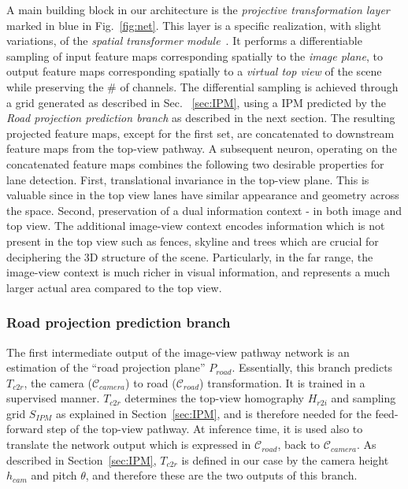 \documentclass[10pt,twocolumn,letterpaper]{article}
\begin{document}
A main building block in our architecture is the \emph{projective transformation layer} marked in blue in Fig.~\ref{fig:net}. This layer is a specific realization, with slight variations, of the \textit{spatial transformer  module}~\cite{spatial_transform}. It performs a differentiable sampling of input feature maps corresponding spatially to the \textit{image plane}, to output feature maps corresponding spatially to a \textit{virtual top view} of the scene while preserving the \# of channels. The differential sampling is achieved through a grid generated as described in Sec. ~\ref{sec:IPM}, using a IPM predicted by the \textit{Road projection prediction branch} as described in the next section. The resulting projected feature maps, except for the first set, are concatenated to downstream feature maps from the top-view pathway. A subsequent neuron, operating on the concatenated feature maps combines the following two desirable properties for lane detection. First, translational invariance in the top-view plane. This is valuable since in the top view lanes have similar appearance and geometry across the space. Second, preservation of a dual information context - in both image and top view. The additional image-view context encodes information which is not present in the top view such as fences, skyline and trees which are crucial for deciphering the 3D structure of the scene. Particularly, in the far range, the image-view context is much richer in visual information, and represents a much larger actual area compared to the top view.


\subsubsection{Road projection prediction branch}
\label{horizon_estimation}
The first intermediate output of the image-view pathway network is an estimation of  the ``road projection plane'' $P_{road}$. Essentially, this branch predicts $T_{c2r}$, the camera ($\mathcal{C}_{camera}$) to road ($\mathcal{C}_{road}$) transformation. It is trained in a supervised manner. $T_{c2r}$ determines the top-view homography $H_{r2i}$ and sampling grid $S_{IPM}$ as explained in Section~\ref{sec:IPM}, and is therefore needed for the feed-forward step of the top-view pathway. At inference time, it is used also to translate the network output which is expressed in $\mathcal{C}_{road}$, back to $\mathcal{C}_{camera}$. As described in Section~\ref{sec:IPM}, $T_{c2r}$ is defined in our case by the camera height $h_{cam}$ and pitch $\theta$, and therefore these are the two outputs of this branch.
\end{document}
